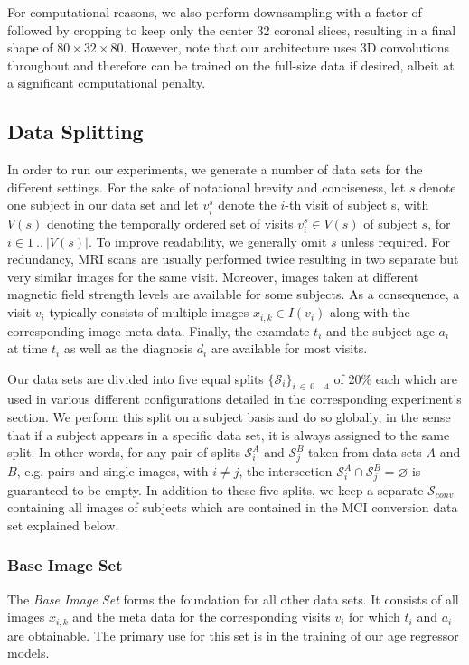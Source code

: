 For computational reasons, we also perform downsampling with a factor of  followed by cropping to keep only the center 32 coronal slices, resulting in a final shape of $ 80 \times 32 \times 80 $. However, note that our architecture uses 3D convolutions throughout and therefore can be trained on the full-size data if desired, albeit at a significant computational penalty.

\subsection{Data Splitting}
\label{sec:datsplitting}
In order to run our experiments, we generate a number of data sets for the different settings. For the sake of notational brevity and conciseness, let $s$ denote one subject in our data set and let $v^s_i$ denote the $i$-th visit of subject s, with $V(s)$ denoting the temporally ordered set of visits $v^s_i \in V(s)$ of subject $s$, for $i \in 1 \ ..\ |V(s)|$. To improve readability, we generally omit $s$ unless required. For redundancy, MRI scans are usually performed twice resulting in two separate but very similar images for the same visit. Moreover, images taken at different magnetic field strength levels are available for some subjects. As a consequence, a visit $v_i$ typically consists of multiple images $x_{i, k} \in I(v_i)$ along with the corresponding image meta data. Finally, the examdate $t_i$ and the subject age $a_i$ at time $t_i$ as well as the diagnosis $d_i$ are available for most visits.

Our data sets are divided into five equal splits $ \{ \mathcal{S}_i \}_{i\ \in\ 0\;..\;4} $ of 20\% each which are used in various different configurations detailed in the corresponding experiment's section. We perform this split on a subject basis and do so globally, in the sense that if a subject appears in a specific data set, it is always assigned to the same split. In other words, for any pair of splits $ \mathcal{S}_i^A $ and $ \mathcal{S}_j^B $ taken from data sets $A$ and $B$, e.g. pairs and single images, with $ i \neq j $, the intersection $ { \mathcal{S}_i^A \cap \mathcal{S}_j^B = \varnothing } $ is guaranteed to be empty. In addition to these five splits, we keep a separate $\mathcal{S}_{conv}$ containing all images of subjects which are contained in the MCI conversion data set explained below.

\subsubsection*{Base Image Set} \label{sec:datsingles}
The \textit{Base Image Set} forms the foundation for all other data sets. It consists of all images $x_{i, k}$ and the meta data for the corresponding visits $v_i$ for which $t_i$ and $a_i$ are obtainable. The primary use for this set is in the training of our age regressor models.

